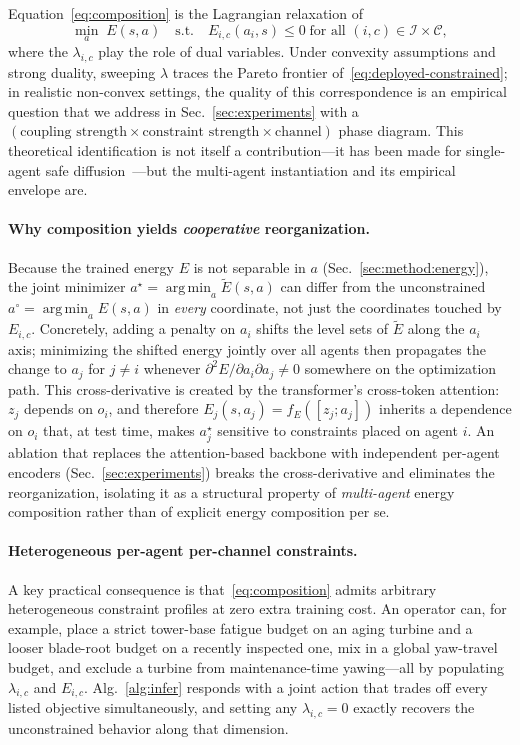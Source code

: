 \documentclass{article}
\begin{document}
Equation~\eqref{eq:composition} is the Lagrangian relaxation of
\begin{equation}
\min_a\; E(s, a) \quad \text{s.t.}\quad E_{i,c}(a_i, s) \leq 0\; \text{for all } (i, c) \in \mathcal{I} \times \mathcal{C},
\label{eq:deployed-constrained}
\end{equation}
where the $\lambda_{i,c}$ play the role of dual variables. Under convexity assumptions and strong duality, sweeping $\lambda$ traces the Pareto frontier of~\eqref{eq:deployed-constrained}; in realistic non-convex settings, the quality of this correspondence is an empirical question that we address in Sec.~\ref{sec:experiments} with a $(\text{coupling strength} \times \text{constraint strength} \times \text{channel})$ phase diagram. This theoretical identification is not itself a contribution---it has been made for single-agent safe diffusion~\citep{algd2026}---but the multi-agent instantiation and its empirical envelope are.

\paragraph{Why composition yields \emph{cooperative} reorganization.}
Because the trained energy $E$ is not separable in $a$ (Sec.~\ref{sec:method:energy}), the joint minimizer $a^\star = \operatorname*{arg\,min}_a \widetilde E(s, a)$ can differ from the unconstrained $a^\circ = \operatorname*{arg\,min}_a E(s, a)$ in \emph{every} coordinate, not just the coordinates touched by $E_{i,c}$. Concretely, adding a penalty on $a_i$ shifts the level sets of $\widetilde E$ along the $a_i$ axis; minimizing the shifted energy jointly over all agents then propagates the change to $a_j$ for $j \neq i$ whenever $\partial^2 E / \partial a_i \partial a_j \neq 0$ somewhere on the optimization path. This cross-derivative is created by the transformer's cross-token attention: $z_j$ depends on $o_i$, and therefore $E_j(s, a_j) = f_E([z_j; a_j])$ inherits a dependence on $o_i$ that, at test time, makes $a_j^\star$ sensitive to constraints placed on agent $i$. An ablation that replaces the attention-based backbone with independent per-agent encoders (Sec.~\ref{sec:experiments}) breaks the cross-derivative and eliminates the reorganization, isolating it as a structural property of \emph{multi-agent} energy composition rather than of explicit energy composition per se.

\paragraph{Heterogeneous per-agent per-channel constraints.}
A key practical consequence is that~\eqref{eq:composition} admits arbitrary heterogeneous constraint profiles at zero extra training cost. An operator can, for example, place a strict tower-base fatigue budget on an aging turbine and a looser blade-root budget on a recently inspected one, mix in a global yaw-travel budget, and exclude a turbine from maintenance-time yawing---all by populating $\lambda_{i,c}$ and $E_{i,c}$. Alg.~\ref{alg:infer} responds with a joint action that trades off every listed objective simultaneously, and setting any $\lambda_{i,c} = 0$ exactly recovers the unconstrained behavior along that dimension.
\end{document}

